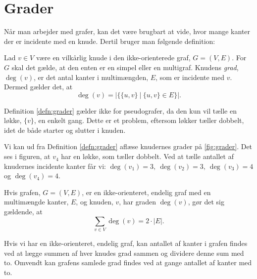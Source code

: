 \section{Grader} \label{sec:grader}
Når man arbejder med grafer, kan det være brugbart at vide, hvor mange kanter der er incidente med en knude. Dertil bruger man følgende definition:

\begin{defn}[Grader] \label{defn:grader}
Lad $v \in V$ være en vilkårlig knude i den ikke-orienterede graf, $G = (V,E)$. For $G$ skal det gælde, at den enten er en simpel eller en multigraf. Knudens \emph{grad}, $\deg(v)$, er det antal kanter i multimængden, $E$, som er incidente med $v$. Dermed gælder det, at
\begin{equation}
\deg(v)=|\{ \{u,v\} \ | \ \{u,v\}\in E \}|.
\end{equation}
\end{defn}

Definition \ref{defn:grader} gælder ikke for pseudografer, da den kun vil tælle en løkke, $\{v\}$, en enkelt gang. Dette er et problem, eftersom løkker tæller dobbelt, idet de både starter og slutter i knuden.

\begin{exmp} \label{ex:grader}

Vi kan ud fra Definition \ref{defn:grader} aflæse knudernes grader på \autoref{fig:grader}. Det ses i figuren, at $v_4$ har en løkke, som tæller dobbelt. Ved at tælle antallet af knudernes incidente kanter får vi: $\deg(v_{1})=3, \ \deg(v_{2})=3, \ \deg(v_{3})=4$ og $\deg(v_{4})=4$.


\end{exmp}

\begin{thm}
Hvis grafen, $G = (V,E)$, er en ikke-orienteret, endelig graf med en multimængde kanter, $E$, og knuden, $v$, har graden $\deg(v)$, gør det sig gældende, at
\begin{equation} \label{eq:degv=2e}
	\sum_{v \in V} { } \deg(v) = 2 \cdot |E|.
\end{equation}
\end{thm}

Hvis vi har en ikke-orienteret, endelig graf, kan antallet af kanter i grafen findes ved at lægge summen af hver knudes grad sammen og dividere denne sum med to. Omvendt kan grafens samlede grad findes ved at gange antallet af kanter med to.

